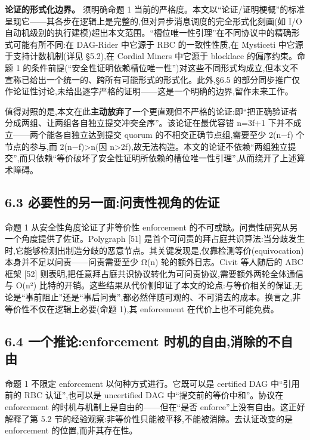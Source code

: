 \documentclass[UTF8,fontset=windows,a4paper,11pt]{ctexart}
\begin{document}
\textbf{论证的形式化边界。} 须明确命题 1 当前的严格度。本文以``论证/证明梗概''的标准呈现它------其各步在逻辑上是完整的,但对异步消息调度的完全形式化刻画(如 I/O 自动机级别的执行建模)超出本文范围。``槽位唯一性引理''在不同协议中的精确形式可能有所不同:在 DAG-Rider 中它源于 RBC 的一致性性质,在 Mysticeti 中它源于支持计数机制(详见 §5.2),在 Cordial Miners 中它源于 blocklace 的偏序约束。命题 1 的条件前提(``安全性证明依赖槽位唯一性'')对这些不同形式均成立,但本文不宣称已给出一个统一的、跨所有可能形式的形式化。此外,§6.5 的部分同步推广仅作论证性讨论,未给出逐字严格的证明------这是一个明确的边界,留作未来工作。

值得对照的是,本文在此\textbf{主动放弃}了一个更直观但不严格的论证:即``把正确验证者分成两组、让两组各自独立提交冲突全序''。该论证在最优容错
n=3f+1 下并不成立------两个能各自独立达到提交 quorum
的不相交正确节点组,需要至少 2(n−f) 个节点的参与,而
2(n−f)\textgreater n(因
n\textgreater2f),故无法构造。本文的论证不依赖``两组独立提交'',而只依赖``等价破坏了安全性证明所依赖的槽位唯一性引理'',从而绕开了上述算术障碍。

\subsection{6.3
必要性的另一面:问责性视角的佐证}\label{ux5fc5ux8981ux6027ux7684ux53e6ux4e00ux9762ux95eeux8d23ux6027ux89c6ux89d2ux7684ux4f50ux8bc1}

命题 1 从安全性角度论证了非等价性 enforcement
的不可或缺。问责性研究从另一个角度提供了佐证。Polygraph {[}51{]}
是首个可问责的拜占庭共识算法:当分歧发生时,它能够检测出制造分歧的恶意节点。其关键发现是,仅靠检测等价(equivocation)本身并不足以问责------问责需要至少
Ω(n) 轮的额外日志。Civit 等人随后的 ABC 框架 {[}52{]}
则表明,把任意拜占庭共识协议转化为可问责协议,需要额外两轮全体通信与 O(n²)
比特的开销。这些结果从代价侧印证了本文的论点:与等价相关的保证,无论是``事前阻止''还是``事后问责'',都必然伴随可观的、不可消去的成本。换言之,非等价性不仅在逻辑上必要(命题
1),其 enforcement 在代价上也不可能免费。

\subsection{6.4 一个推论:enforcement
时机的自由,消除的不自由}\label{ux4e00ux4e2aux63a8ux8bbaenforcement-ux65f6ux673aux7684ux81eaux7531ux6d88ux9664ux7684ux4e0dux81eaux7531}

命题 1 不限定 enforcement 以何种方式进行。它既可以是 certified DAG
中``引用前的 RBC 认证'',也可以是 uncertified DAG
中``提交前的等价中和''。协议在 enforcement
的时机与机制上是自由的------但在``是否
enforce''上没有自由。这正好解释了第 5.2
节的经验观察:非等价性只能被平移,不能被消除。去认证改变的是 enforcement
的位置,而非其存在性。
\end{document}
